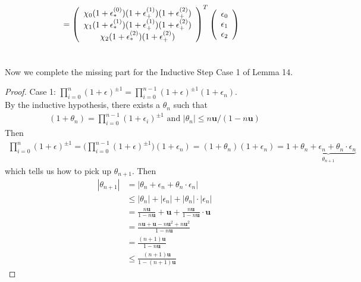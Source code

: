 \documentclass[11pt,a4paper]{article}
\newcommand{\bu}{\mathbf{u}}
\begin{document}
\begin{align}
    & =  \left(\begin{array}{c} 
           \chi_0 (1+\epsilon_{*}^{(0)})(1+\epsilon_{+}^{(1)})(1+\epsilon_{+}^{(2)}) \\
           \chi_1 (1+\epsilon_{*}^{(1)})(1+\epsilon_{+}^{(1)})(1+\epsilon_{+}^{(2)}) \\ 
           \chi_2 (1+\epsilon_{*}^{(2)})(1+\epsilon_{+}^{(2)}) \\ \end{array} \right)^T 
    \left(\begin{array}{c} \epsilon_0 \\ \epsilon_1 \\ \epsilon_2 \\ \end{array} \right)
\end{align}

\setcounter{section}{14}
\section{}
Now we complete the missing part for the Inductive Step Case 1 of Lemma 14.
\begin{proof}
    Case 1: $\prod_{i=0}^{n}(1+\epsilon)^{\pm 1}=\prod_{i=0}^{n-1}(1+\epsilon)^{\pm1} (1+\epsilon_n)$.\\
    By the inductive hypothesis, there exists a $\theta_n$ such that 
    \begin{align}
        (1+\theta_n) = \prod_{i=0}^{n-1} (1+\epsilon_i)^{\pm 1} \text{ and }
    |\theta_n| \leq n\bu/(1-n\bu)
    \end{align}
    Then
    \begin{align}
        \prod_{i=0}^{n}(1+\epsilon)^{\pm 1}
        = \bigg( \prod_{i=0}^{n-1}(1+\epsilon)^{\pm1} \bigg) (1+\epsilon_n)
        = (1+\theta_n) (1+\epsilon_n)
        = 1 + \underbrace{\theta_n + \epsilon_n + \theta_n \cdot \epsilon_n}_{\theta_{n+1}}
    \end{align}
    which tells us how to pick up $\theta_{n+1}$. Then
    \begin{align}
       |\theta_{n+1}| 
       &= |\theta_n + \epsilon_n + \theta_n \cdot \epsilon_n|\\
       &\leq |\theta_n| + |\epsilon_n| + |\theta_n| \cdot |\epsilon_n|\\
       &= \frac{n\bu}{1-n\bu} + \bu + \frac{n\bu}{1-n\bu} \cdot \bu \\
       &= \frac{n\bu + \bu - n \bu^2 +n\bu^2 }{1-n\bu} \\
       &= \frac{(n+1)\bu}{1-n\bu} \\
       &\leq \frac{(n+1)\bu}{1-(n+1)\bu}
    \end{align}
\end{proof}
\end{document}
